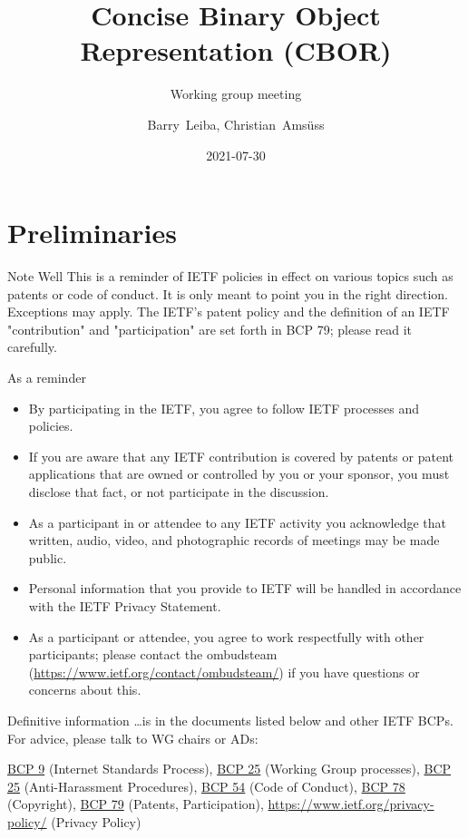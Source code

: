 \documentclass[aspectratio=169]{beamer}
\title{Concise Binary Object Representation (CBOR)}
\subtitle{Working group meeting}
\author{Barry~Leiba, Christian~Amsüss}
\institute{\normalsize{IETF 111, virtual San Francisco}}
\date{2021-07-30}
\begin{document}
\frame{\titlepage}

\section*{Preliminaries}

\begin{frame}{Note Well}\scriptsize
This is a reminder of IETF policies in effect on various topics such as patents or code of conduct. It is only meant to point you in the right direction. Exceptions may apply. The IETF's patent policy and the definition of an IETF "contribution" and "participation" are set forth in BCP 79; please read it carefully.

	\begin{block}{\small As a reminder\qquad\mbox{}}

	\vspace{-1.65em}

	\begin{itemize}
		\item By participating in the IETF, you agree to follow IETF processes and policies.
		\item If you are aware that any IETF contribution is covered by patents or patent applications that are owned or controlled by you or your sponsor, you must disclose that fact, or not participate in the discussion.
		\item As a participant in or attendee to any IETF activity you acknowledge that written, audio, video, and photographic records of meetings may be made public.
		\item Personal information that you provide to IETF will be handled in accordance with the IETF Privacy Statement.
		\item As a participant or attendee, you agree to work respectfully with other participants; please contact the ombudsteam (\url{https://www.ietf.org/contact/ombudsteam/}) if you have questions or concerns about this.
	\end{itemize}

	\end{block}

	\vspace{-1em}
	\begin{block}{\small Definitive information}
\ldots is in the documents listed below and other IETF BCPs. For advice, please talk to WG chairs or ADs:

\href{https://www.rfc-editor.org/info/bcp9}{BCP 9} (Internet Standards Process),
\href{https://www.rfc-editor.org/info/bcp25}{BCP 25} (Working Group processes),
\href{https://www.rfc-editor.org/info/bcp25}{BCP 25} (Anti-Harassment Procedures),
\href{https://www.rfc-editor.org/info/bcp54}{BCP 54} (Code of Conduct),
\href{https://www.rfc-editor.org/info/bcp78}{BCP 78} (Copyright),
\href{https://www.rfc-editor.org/info/bcp79}{BCP 79} (Patents, Participation),
\url{https://www.ietf.org/privacy-policy/} (Privacy Policy)
	\end{block}
\end{frame}
\end{document}
